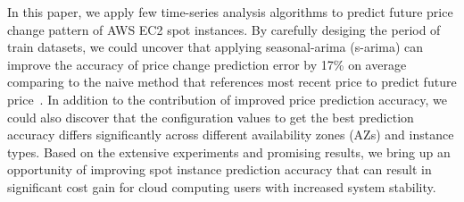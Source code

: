\documentclass[graybox]{svmult}
\begin{document}
In this paper, we apply few time-series analysis algorithms to predict future price change pattern of AWS EC2 spot instances. By carefully desiging the period of train datasets, we could uncover that applying seasonal-arima (s-arima) can improve the accuracy of price change prediction error by 17\% on average comparing to the naive method that references most recent price to predict future price~\cite{deep-spot-cloud}. In addition to the contribution of improved price prediction accuracy, we could also discover that the configuration values to get the best prediction accuracy differs significantly across different availability zones (AZs) and instance types. Based on the extensive experiments and promising results, we bring up an opportunity of improving spot instance prediction accuracy that can result in significant cost gain for cloud computing users with increased system stability.
\end{document}
